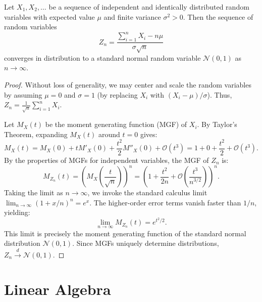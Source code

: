 \documentclass[11pt]{scrartcl}
\begin{document}
\begin{theorem}
    Let $X_1, X_2, \dots$ be a sequence of independent and identically distributed random variables with expected value $\mu$ and finite variance $\sigma^2 > 0$. Then the sequence of random variables
    \[ Z_n = \frac{\sum_{i=1}^n X_i - n\mu}{\sigma \sqrt{n}} \]
    converges in distribution to a standard normal random variable $\mathcal{N}(0,1)$ as $n \to \infty$.
\end{theorem}
\begin{proof}
    Without loss of generality, we may center and scale the random variables by assuming $\mu = 0$ and $\sigma = 1$ (by replacing $X_i$ with $(X_i-\mu)/\sigma$). Thus, $Z_n = \frac{1}{\sqrt{n}} \sum_{i=1}^n X_i$.
    
    Let $M_X(t)$ be the moment generating function (MGF) of $X_i$. By Taylor's Theorem, expanding $M_X(t)$ around $t=0$ gives:
    \[ M_X(t) = M_X(0) + t M'_X(0) + \frac{t^2}{2} M''_X(0) + \mathcal{O}(t^3) = 1 + 0 + \frac{t^2}{2} + \mathcal{O}(t^3). \]
    By the properties of MGFs for independent variables, the MGF of $Z_n$ is:
    \[ M_{Z_n}(t) = \left( M_X\left(\frac{t}{\sqrt{n}}\right) \right)^n = \left( 1 + \frac{t^2}{2n} + \mathcal{O}\left(\frac{t^3}{n^{3/2}}\right) \right)^n. \]
    Taking the limit as $n \to \infty$, we invoke the standard calculus limit $\lim_{n \to \infty} (1 + x/n)^n = e^x$. The higher-order error terms vanish faster than $1/n$, yielding:
    \[ \lim_{n \to \infty} M_{Z_n}(t) = e^{t^2/2}. \]
    This limit is precisely the moment generating function of the standard normal distribution $\mathcal{N}(0,1)$. Since MGFs uniquely determine distributions, $Z_n \xrightarrow{d} \mathcal{N}(0,1)$.
\end{proof}

\section{Linear Algebra}
\end{document}
